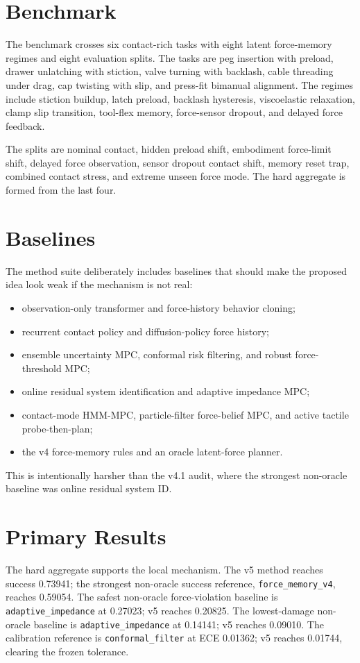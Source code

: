 \documentclass{article}
\newcommand{\method}[1]{\texttt{#1}}
\begin{document}
\section{Benchmark}
The benchmark crosses six contact-rich tasks with eight latent force-memory regimes and eight evaluation splits. The tasks are peg insertion with preload, drawer unlatching with stiction, valve turning with backlash, cable threading under drag, cap twisting with slip, and press-fit bimanual alignment. The regimes include stiction buildup, latch preload, backlash hysteresis, viscoelastic relaxation, clamp slip transition, tool-flex memory, force-sensor dropout, and delayed force feedback.

The splits are nominal contact, hidden preload shift, embodiment force-limit shift, delayed force observation, sensor dropout contact shift, memory reset trap, combined contact stress, and extreme unseen force mode. The hard aggregate is formed from the last four.

\section{Baselines}
The method suite deliberately includes baselines that should make the proposed idea look weak if the mechanism is not real:
\begin{itemize}
\item observation-only transformer and force-history behavior cloning;
\item recurrent contact policy and diffusion-policy force history;
\item ensemble uncertainty MPC, conformal risk filtering, and robust force-threshold MPC;
\item online residual system identification and adaptive impedance MPC;
\item contact-mode HMM-MPC, particle-filter force-belief MPC, and active tactile probe-then-plan;
\item the v4 force-memory rules and an oracle latent-force planner.
\end{itemize}
This is intentionally harsher than the v4.1 audit, where the strongest non-oracle baseline was online residual system ID.

\section{Primary Results}
The hard aggregate supports the local mechanism. The v5 method reaches success 0.73941; the strongest non-oracle success reference, \method{force\_memory\_v4}, reaches 0.59054. The safest non-oracle force-violation baseline is \method{adaptive\_impedance} at 0.27023; v5 reaches 0.20825. The lowest-damage non-oracle baseline is \method{adaptive\_impedance} at 0.14141; v5 reaches 0.09010. The calibration reference is \method{conformal\_filter} at ECE 0.01362; v5 reaches 0.01744, clearing the frozen tolerance.
\end{document}
